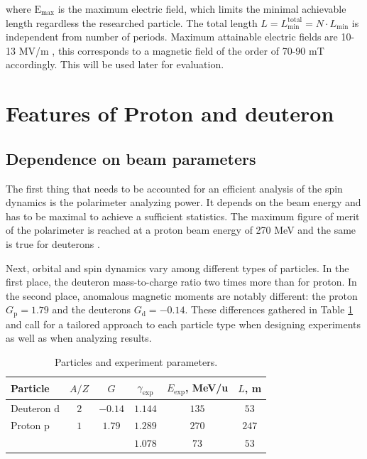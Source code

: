 \documentclass[submitting]{nst}
\begin{document}
\noindent where $\mathrm{E}_{\text{max}}$ is the maximum electric field, which limits the minimal achievable length regardless the researched particle. The total length $L=L_{\text{min}}^{\text{total}} = N\cdot L_{\text{min}}$ is independent from number of periods. Maximum attainable electric fields are 10-13 MV/m \cite{wien}, this corresponds to a magnetic field of the order of 70-90 mT accordingly. This will be used later for evaluation.

\section{Features of Proton and deuteron}\label{sec.III}

\subsection{Dependence on beam parameters}

\par The first thing that needs to be accounted for an efficient analysis of the spin dynamics is the polarimeter analyzing power. It depends on the beam energy and has to be maximal to achieve a sufficient statistics. The maximum figure of merit of the polarimeter is reached at a proton beam energy of 270  MeV \cite{Pol} and the same is true for deuterons \cite{Pol_d}. 

\par Next, orbital and spin dynamics vary among different types of particles. In the first place, the deuteron mass-to-charge ratio two times more than for proton. In the second place, anomalous magnetic moments are notably different: the proton $G_{\text{p}} = 1.79$ and the deuterons $G_{\text{d}} = -0.14$. These differences gathered in Table \ref{tab:particles} and call for a tailored approach to each particle type when designing experiments as well as when analyzing results.

\begin{table}[!htb]
	\caption{Particles and experiment parameters.}
	\label{tab:particles}
	\begin{tabular*}{8cm} {@{\extracolsep{\fill} } lccccc}
		\toprule
		Particle & $A/Z$ & $G$     & $\gamma_{\text{exp}}$ & $E_{\text{exp}}$, MeV/u & $L$, m \\
		\midrule
		Deuteron $\text{d}$ & $2$   & $-0.14$ & $1.144$  & $135$ & $53$ \\
		Proton $\text{p}$ & $1$   & $1.79$  & $1.289$ & $270$ & $247$ \\
		&    &   & $1.078$ & $73$ & $53$ \\
		\bottomrule
	\end{tabular*}
\end{table}
\end{document}
